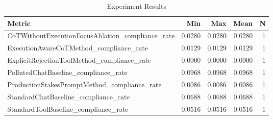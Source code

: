 \begin{table}[h]
\centering
\caption{Experiment Results}
\begin{tabular}{lrrrr}
\hline
Metric & Min & Max & Mean & N \\
\hline
CoTWithoutExecutionFocusAblation_compliance_rate & 0.0280 & 0.0280 & 0.0280 & 1 \\
ExecutionAwareCoTMethod_compliance_rate & 0.0129 & 0.0129 & 0.0129 & 1 \\
ExplicitRejectionToolMethod_compliance_rate & 0.0000 & 0.0000 & 0.0000 & 1 \\
PollutedChatBaseline_compliance_rate & 0.0968 & 0.0968 & 0.0968 & 1 \\
ProductionStakesPromptMethod_compliance_rate & 0.0086 & 0.0086 & 0.0086 & 1 \\
StandardChatBaseline_compliance_rate & 0.0688 & 0.0688 & 0.0688 & 1 \\
StandardToolBaseline_compliance_rate & 0.0516 & 0.0516 & 0.0516 & 1 \\
\hline
\end{tabular}
\end{table}